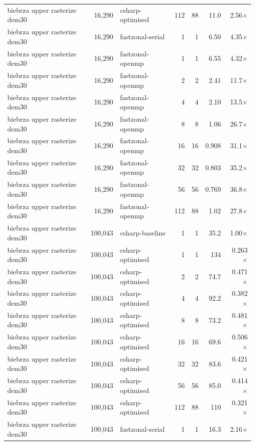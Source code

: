 \begin{tabular}{lrlrrrr}
biebrza upper rasterize dem30 & 16,290 & csharp-optimised & 112 & 88 & 11.0 & 2.56$\times$ \\
biebrza upper rasterize dem30 & 16,290 & fastzonal-serial & 1 & 1 & 6.50 & 4.35$\times$ \\
biebrza upper rasterize dem30 & 16,290 & fastzonal-openmp & 1 & 1 & 6.55 & 4.32$\times$ \\
biebrza upper rasterize dem30 & 16,290 & fastzonal-openmp & 2 & 2 & 2.41 & 11.7$\times$ \\
biebrza upper rasterize dem30 & 16,290 & fastzonal-openmp & 4 & 4 & 2.10 & 13.5$\times$ \\
biebrza upper rasterize dem30 & 16,290 & fastzonal-openmp & 8 & 8 & 1.06 & 26.7$\times$ \\
biebrza upper rasterize dem30 & 16,290 & fastzonal-openmp & 16 & 16 & 0.908 & 31.1$\times$ \\
biebrza upper rasterize dem30 & 16,290 & fastzonal-openmp & 32 & 32 & 0.803 & 35.2$\times$ \\
biebrza upper rasterize dem30 & 16,290 & fastzonal-openmp & 56 & 56 & 0.769 & 36.8$\times$ \\
biebrza upper rasterize dem30 & 16,290 & fastzonal-openmp & 112 & 88 & 1.02 & 27.8$\times$ \\
biebrza upper rasterize dem30 & 100,043 & csharp-baseline & 1 & 1 & 35.2 & 1.00$\times$ \\
biebrza upper rasterize dem30 & 100,043 & csharp-optimised & 1 & 1 & 134 & 0.263$\times$ \\
biebrza upper rasterize dem30 & 100,043 & csharp-optimised & 2 & 2 & 74.7 & 0.471$\times$ \\
biebrza upper rasterize dem30 & 100,043 & csharp-optimised & 4 & 4 & 92.2 & 0.382$\times$ \\
biebrza upper rasterize dem30 & 100,043 & csharp-optimised & 8 & 8 & 73.2 & 0.481$\times$ \\
biebrza upper rasterize dem30 & 100,043 & csharp-optimised & 16 & 16 & 69.6 & 0.506$\times$ \\
biebrza upper rasterize dem30 & 100,043 & csharp-optimised & 32 & 32 & 83.6 & 0.421$\times$ \\
biebrza upper rasterize dem30 & 100,043 & csharp-optimised & 56 & 56 & 85.0 & 0.414$\times$ \\
biebrza upper rasterize dem30 & 100,043 & csharp-optimised & 112 & 88 & 110 & 0.321$\times$ \\
biebrza upper rasterize dem30 & 100,043 & fastzonal-serial & 1 & 1 & 16.3 & 2.16$\times$ \\

\end{tabular}
